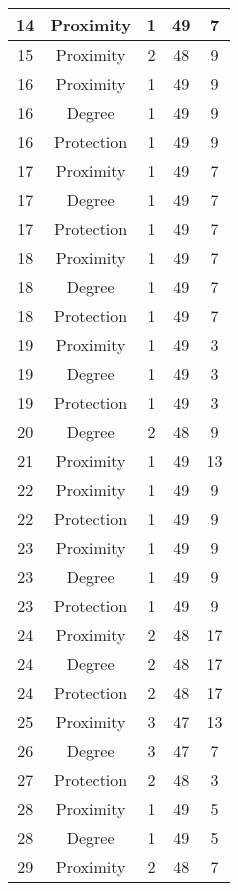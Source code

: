 \documentclass[results.tex]{subfiles}
\begin{document}
\begin{center}
\begin{tabular}{| c || c | c | c | c |}
    \hline
    14 & Proximity & 1 & 49 & 7 \\ 
    \hline
    15 & Proximity & 2 & 48 & 9 \\ 
    \hline
    16 & Proximity & 1 & 49 & 9 \\ 
    \hline
    16 & Degree & 1 & 49 & 9 \\ 
    \hline
    16 & Protection & 1 & 49 & 9 \\ 
    \hline
    17 & Proximity & 1 & 49 & 7 \\ 
    \hline
    17 & Degree & 1 & 49 & 7 \\ 
    \hline
    17 & Protection & 1 & 49 & 7 \\ 
    \hline
    18 & Proximity & 1 & 49 & 7 \\ 
    \hline
    18 & Degree & 1 & 49 & 7 \\ 
    \hline
    18 & Protection & 1 & 49 & 7 \\ 
    \hline
    19 & Proximity & 1 & 49 & 3 \\ 
    \hline
    19 & Degree & 1 & 49 & 3 \\ 
    \hline
    19 & Protection & 1 & 49 & 3 \\ 
    \hline
    20 & Degree & 2 & 48 & 9 \\ 
    \hline
    21 & Proximity & 1 & 49 & 13 \\ 
    \hline
    22 & Proximity & 1 & 49 & 9 \\ 
    \hline
    22 & Protection & 1 & 49 & 9 \\ 
    \hline
    23 & Proximity & 1 & 49 & 9 \\ 
    \hline
    23 & Degree & 1 & 49 & 9 \\ 
    \hline
    23 & Protection & 1 & 49 & 9 \\ 
    \hline
    24 & Proximity & 2 & 48 & 17 \\ 
    \hline
    24 & Degree & 2 & 48 & 17 \\ 
    \hline
    24 & Protection & 2 & 48 & 17 \\ 
    \hline
    25 & Proximity & 3 & 47 & 13 \\ 
    \hline
    26 & Degree & 3 & 47 & 7 \\ 
    \hline
    27 & Protection & 2 & 48 & 3 \\ 
    \hline
    28 & Proximity & 1 & 49 & 5 \\ 
    \hline
    28 & Degree & 1 & 49 & 5 \\ 
    \hline
    29 & Proximity & 2 & 48 & 7 \\ 
    \hline

\end{tabular}
\end{center}
\end{document}
